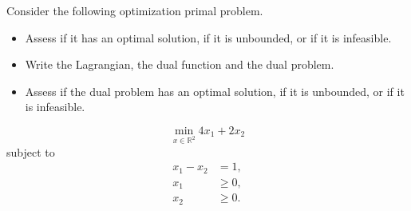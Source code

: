 
Consider  the following optimization primal problem.
\begin{itemize}
\item Assess if it has an optimal solution, if it is unbounded, or if it
  is infeasible.
\item Write the Lagrangian, the dual function and the dual problem.
\item Assess if the dual problem  has an optimal solution, if it is unbounded, or if it  is infeasible.
\end{itemize}

$$\min_{x \in \mathbb{R}^2} 4x_1+2x_2$$ 
subject to 
\begin{align*}
x_1-x_2 & = 1,\\
x_1 & \geq 0,\\
x_2 & \geq 0.
\end{align*}

